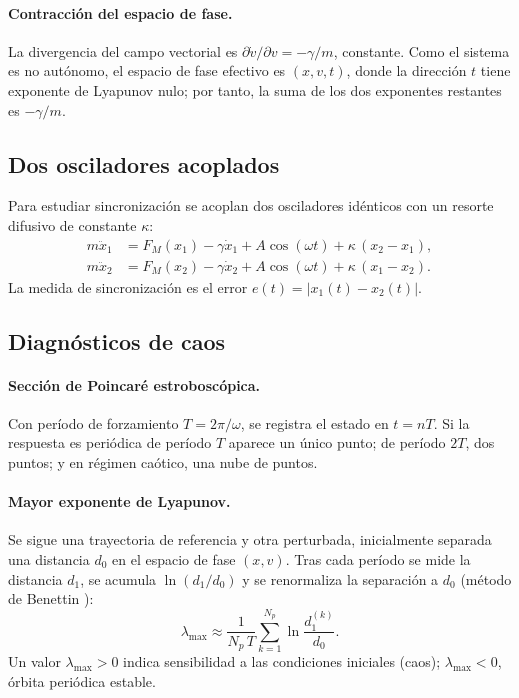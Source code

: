 \documentclass[12pt,a4paper]{article}
\begin{document}
\paragraph{Contracción del espacio de fase.} La divergencia del campo vectorial es $\partial\dot v/\partial v=-\gamma/m$, constante. Como el sistema es no autónomo, el espacio de fase efectivo es $(x,v,t)$, donde la dirección $t$ tiene exponente de Lyapunov nulo; por tanto, la suma de los dos exponentes restantes es $-\gamma/m$.

\subsection{Dos osciladores acoplados}

Para estudiar sincronización se acoplan dos osciladores idénticos con un resorte difusivo de constante $\kappa$:
\begin{align}
    m\ddot x_1 &= F_M(x_1) - \gamma\dot x_1 + A\cos(\omega t) + \kappa\,(x_2-x_1),\\
    m\ddot x_2 &= F_M(x_2) - \gamma\dot x_2 + A\cos(\omega t) + \kappa\,(x_1-x_2).
\end{align}
La medida de sincronización es el error $e(t)=|x_1(t)-x_2(t)|$.

\subsection{Diagnósticos de caos}

\paragraph{Sección de Poincaré estroboscópica.} Con período de forzamiento $T=2\pi/\omega$, se registra el estado en $t=nT$. Si la respuesta es periódica de período $T$ aparece un único punto; de período $2T$, dos puntos; y en régimen caótico, una nube de puntos.

\paragraph{Mayor exponente de Lyapunov.} Se sigue una trayectoria de referencia y otra perturbada, inicialmente separada una distancia $d_0$ en el espacio de fase $(x,v)$. Tras cada período se mide la distancia $d_1$, se acumula $\ln(d_1/d_0)$ y se renormaliza la separación a $d_0$ (método de Benettin \cite{benettin1980}):
\begin{equation}
    \lambda_{\max} \approx \frac{1}{N_p\,T}\sum_{k=1}^{N_p}\ln\frac{d_1^{(k)}}{d_0}.
\end{equation}
Un valor $\lambda_{\max}>0$ indica sensibilidad a las condiciones iniciales (caos); $\lambda_{\max}<0$, órbita periódica estable.
\end{document}
